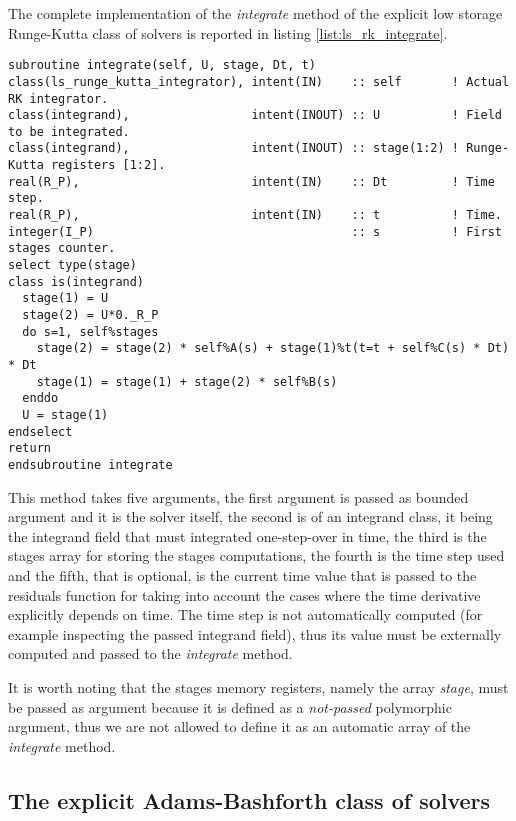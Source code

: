 The complete implementation of the \emph{integrate} method of the explicit low storage Runge-Kutta class of solvers is reported in listing \ref{list:ls_rk_integrate}.

\begin{lstlisting}[firstnumber=1,style=code,caption={implementation of the \emph{integrate} method of explicit low storage Runge-Kutta class},label={list:ls_rk_integrate}]
subroutine integrate(self, U, stage, Dt, t)
class(ls_runge_kutta_integrator), intent(IN)    :: self       ! Actual RK integrator.
class(integrand),                 intent(INOUT) :: U          ! Field to be integrated.
class(integrand),                 intent(INOUT) :: stage(1:2) ! Runge-Kutta registers [1:2].
real(R_P),                        intent(IN)    :: Dt         ! Time step.
real(R_P),                        intent(IN)    :: t          ! Time.
integer(I_P)                                    :: s          ! First stages counter.
select type(stage)
class is(integrand)
  stage(1) = U
  stage(2) = U*0._R_P
  do s=1, self%stages
    stage(2) = stage(2) * self%A(s) + stage(1)%t(t=t + self%C(s) * Dt) * Dt
    stage(1) = stage(1) + stage(2) * self%B(s)
  enddo
  U = stage(1)
endselect
return
endsubroutine integrate
\end{lstlisting}

This method takes five arguments, the first argument is passed as bounded argument and it is the solver itself, the second is of an integrand class, it being the integrand field that must integrated one-step-over in time, the third is the stages array for storing the stages computations, the fourth is the time step used and the fifth, that is optional, is the current time value that is passed to the residuals function for taking into account the cases where the time derivative explicitly depends on time. The time step is not automatically computed (for example inspecting the passed integrand field), thus its value must be externally computed and passed to the \emph{integrate} method.

It is worth noting that the stages memory registers, namely the array \emph{stage}, must be passed as argument because it is defined as a \emph{not-passed} polymorphic argument, thus we are not allowed to define it as an automatic array of the \emph{integrate} method.

\subsection{The explicit Adams-Bashforth class of solvers}\label{subsec:solver_ab}

